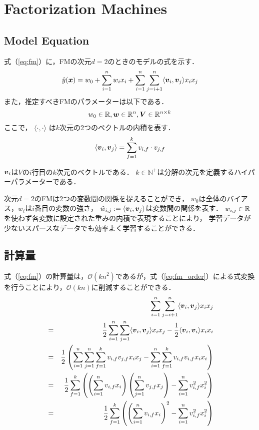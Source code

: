 \section{Factorization Machines}
\subsection{Model Equation}

式（\ref{eq:fm}）に，FMの次元$d = 2$のときのモデルの式を示す．
\begin{equation}
  \hat{y}(\mbox{\boldmath $x$}) = w_{0} + \sum_{i=1}^{n}w_{i}{x}_{i} + \sum_{i=1}^{n} \sum_{j=i+1}^{n} \langle \mbox{\boldmath $v$}_{i}, \mbox{\boldmath $v$}_{j} \rangle{x}_{i}{x}_{j} \label{eq:fm}
\end{equation}
また，推定すべきFMのパラメーターは以下である．
\begin{equation}
    w_{0} \in \mathbb{R}, \mbox{\boldmath $w$} \in \mathbb{R}^{n}, \mbox{\boldmath $V$} \in \mathbb{R}^{n \times k}
\end{equation}
ここで， $\langle \cdot, \cdot \rangle$ は$k$次元の2つのベクトルの内積を表す．
\begin{equation}
  \langle \mbox{\boldmath $v$}_{i}, \mbox{\boldmath $v$}_{j} \rangle = \sum_{f=1}^{k} v_{i,f} \cdot v_{j,f}
\end{equation}

$\mbox{\boldmath $v$}_{i}$は$V$の$i$行目の$k$次元のベクトルである．
$k \in \mathbb{N}^{+}$は分解の次元を定義するハイパーパラメーターである．

次元$d=2$のFMは2つの変数間の関係を捉えることができ，
$w_{0}$は全体のバイアス，$w_{i}$は$i$番目の変数の強さ，
$\hat{w}_{i, j} := \dt<\vtr{v}_{i}, \vtr{v}_{j}>$は変数間の関係を表す．
$w_{i, j} \in \mathbb{R}$を使わず各変数に設定された重みの内積で表現することにより，
学習データが少ないスパースなデータでも効率よく学習することができる．


\subsection{計算量}

式（\ref{eq:fm}）の計算量は，$\mathcal{O}(kn^{2})$であるが，式（\ref{eq:fm_order}）による式変換を行うことにより，$\mathcal{O}(kn)$に削減することができる．
\begin{eqnarray}
  && \sum_{i=1}^{n} \sum_{j=i+1}^{n} \langle \mbox{\boldmath $v$}_{i}, \mbox{\boldmath $v$}_{j} \rangle{x}_{i}{x}_{j} \nonumber \\
  &=& \frac{1}{2} \sum_{i=1}^{n} \sum_{j=1}^{n} \langle \mbox{\boldmath $v$}_{i}, \mbox{\boldmath $v$}_{j} \rangle{x}_{i}{x}_{j} - \frac{1}{2} \langle \mbox{\boldmath $v$}_{i}, \mbox{\boldmath $v$}_{i} \rangle{x}_{i}{x}_{i} \nonumber \\
  &=& \frac{1}{2} \left( \sum_{i=1}^{n} \sum_{j=1}^{n} \sum_{f=1}^{k} v_{i,f} v_{j,f}{x}_{i}{x}_{j} - \sum_{i=1}^{n} \sum_{f=1}^{k} v_{i,f} v_{i,f}{x}_{i}{x}_{i} \right) \nonumber \\
  &=& \frac{1}{2} \sum_{f=1}^{k} \left ( \left ( \sum_{i=1}^{n} v_{i,f}{x}_{i} \right ) \left ( \sum_{j=1}^{n} v_{j,f}{x}_{j} \right ) - \sum_{i=1}^{n} v_{i,f}^{2}{x}_{i}^{2} \right) \nonumber \\
  &=& \frac{1}{2} \sum_{f=1}^{k} \left ( \left ( \sum_{i=1}^{n} v_{i,f}{x}_{i} \right )^{2}  - \sum_{i=1}^{n} v_{i,f}^{2}{x}_{i}^{2} \right ) \label{eq:fm_order}
\end{eqnarray}

